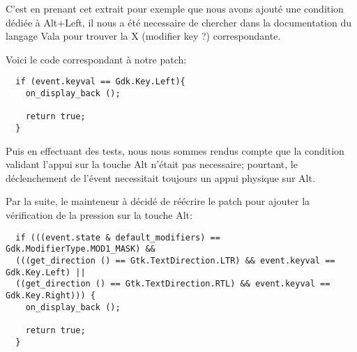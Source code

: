 \documentclass[12pt]{report}
\begin{document}
C'est en prenant cet extrait pour exemple que nous avons ajouté une
condition dédiée à Alt+Left, il nous a été necessaire de chercher dans
la documentation du langage Vala pour trouver la X (modifier key ?)
correspondante.

Voici le code correspondant à notre patch:

\begin{verbatim}
  if (event.keyval == Gdk.Key.Left){			
    on_display_back ();
    
    return true;
  }
\end{verbatim}

Puis en effectuant des tests, nous nous sommes rendus compte que la
condition validant l'appui sur la touche Alt n'était pas necessaire;
pourtant, le déclenchement de l'évent necessitait toujours un appui
physique sur Alt.

Par la suite, le mainteneur à décidé de réécrire le patch pour ajouter
la vérification de la pression sur la touche Alt:

\begin{verbatim}
  if (((event.state & default_modifiers) == Gdk.ModifierType.MOD1_MASK) &&
  (((get_direction () == Gtk.TextDirection.LTR) && event.keyval == Gdk.Key.Left) ||
  ((get_direction () == Gtk.TextDirection.RTL) && event.keyval == Gdk.Key.Right))) {
    on_display_back ();

    return true;
  }
\end{verbatim}




\appendix



\end{document}
